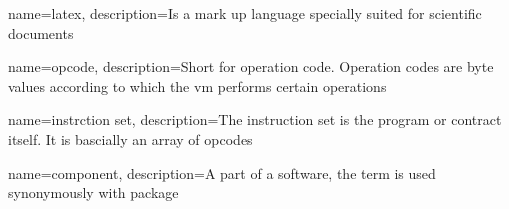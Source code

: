\makeglossaries

{
        name=latex,
        description={Is a mark up language specially suited for
scientific documents}
}


{
        name=opcode,
        description={Short for operation code. Operation codes are byte values according to which the vm performs certain operations}
}

{
        name=instrction set,
        description={The instruction set is the program or contract itself. It is bascially an array of opcodes}
}

{
        name=component,
        description={A part of a software, the term is used synonymously with package}
}
